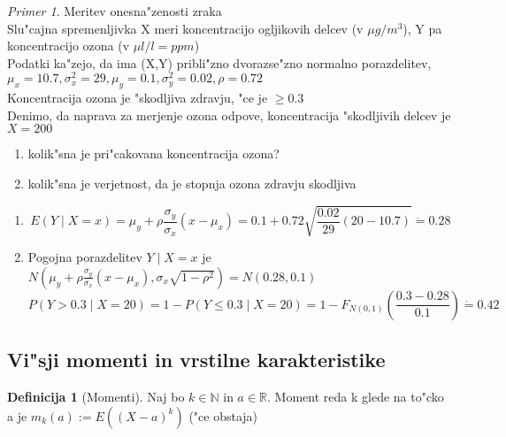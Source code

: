 \documentclass[a4paper,12pt]{article}
\theoremstyle{definition}
\newtheorem{defn}[counter]{Definicija}
\theoremstyle{remark}
\newtheorem*{ex}{Primer}
\newcommand{\N}{\mathbb{N}}
\newcommand{\R}{\mathbb{R}}
\begin{document}
\begin{enumerate}[label=\Alph*]
        \begin{ex}
            Meritev onesna"zenosti zraka \\
            Slu"cajna spremenljivka X meri koncentracijo ogljikovih delcev (v $\mu g / m^3$), Y pa koncentracijo ozona (v $\mu l/l = ppm$) \\
            Podatki ka"zejo, da ima (X,Y) pribli"zno dvorazse"zno normalno porazdelitev, $\mu_x = 10.7, \sigma_x^2 = 29, \mu_y = 0.1,
            \sigma_y^2 = 0.02, \rho = 0.72$ \\
            Koncentracija ozona je "skodljiva zdravju, "ce je $\geq 0.3$ \\
            Denimo, da naprava za merjenje ozona odpove, koncentracija "skodljivih delcev je $X = 200$
            \begin{enumerate}[label=\alph*]
                \item kolik"sna je pri"cakovana koncentracija ozona?
                \item kolik"sna je verjetnost, da je stopnja ozona zdravju skodljiva
            \end{enumerate}
            \begin{enumerate}[label=\alph*]
                \item \[E(Y \mid X=x) = \mu_y + \rho \frac{\sigma_y}{\sigma_x} (x - \mu_x) =
                    0.1 + 0.72 \sqrt{\frac{0.02}{29} (20 - 10.7)} \dot{=} 0.28 \]
                \item Pogojna porazdelitev $Y \mid X=x$ je $N(\mu_y + \rho \frac{\sigma_y}{\sigma_x} (x - \mu_x), \sigma_x \sqrt{1 - \rho^2}) =
                    N(0.28, 0.1)$ \\
                    \[P(Y>0.3 \mid X=20) = 1 - P(Y \leq 0.3 \mid X=20) = 1 - F_{N(0,1)} (\frac{0.3 - 0.28}{0.1}) \dot{=} 0.42 \]
            \end{enumerate}
        \end{ex}
\end{enumerate}

\subsection{Vi"sji momenti in vrstilne karakteristike}

\begin{defn}[Momenti]
    Naj bo $k \in \N$ in $a \in \R$. Moment reda k glede na to"cko a je $m_k(a) := E((X-a)^k)$ ("ce obstaja)
\end{defn}
\end{document}
